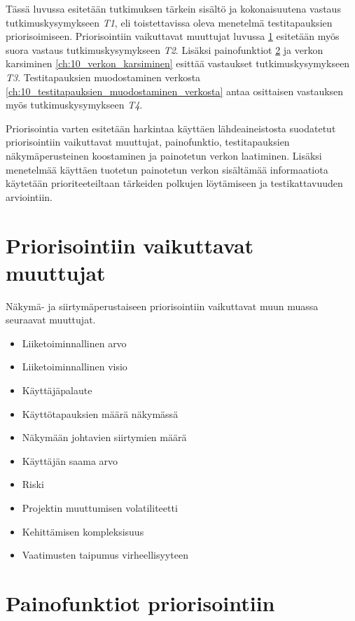 Tässä luvussa esitetään tutkimuksen tärkein sisältö ja kokonaisuutena vastaus tutkimuskysymykseen \emph{T1}, eli toistettavissa oleva menetelmä testitapauksien priorisoimiseen.
Priorisointiin vaikuttavat muuttujat luvussa \ref{ch:10_priorisointiin_vaikuttavat_muuttujat} esitetään myös suora vastaus tutkimuskysymykseen \emph{T2}.
Lisäksi painofunktiot \ref{ch:10_painofunktiot_priorisointiin} ja verkon karsiminen \ref{ch:10_verkon_karsiminen} esittää vastaukset tutkimuskysymykseen \emph{T3}.
Testitapauksien muodostaminen verkosta \ref{ch:10_testitapauksien_muodostaminen_verkosta} antaa osittaisen vastauksen myös tutkimuskysymykseen \emph{T4}.

Priorisointia varten esitetään harkintaa käyttäen lähdeaineistosta suodatetut priorisointiin vaikuttavat muuttujat, painofunktio, testitapauksien näkymäperusteinen koostaminen ja painotetun verkon laatiminen.
Lisäksi menetelmää käyttäen tuotetun painotetun verkon sisältämää informaatiota käytetään prioriteeteiltaan tärkeiden polkujen löytämiseen ja testikattavuuden arviointiin.

\section{Priorisointiin vaikuttavat muuttujat} \label{ch:10_priorisointiin_vaikuttavat_muuttujat}

  Näkymä- ja siirtymäperustaiseen priorisointiin vaikuttavat muun muassa seuraavat muuttujat.

  \begin{itemize}
    \item Liiketoiminnallinen arvo
    \item Liiketoiminnallinen visio
    \item Käyttäjäpalaute
    \item Käyttötapauksien määrä näkymässä
    \item Näkymään johtavien siirtymien määrä
    \item Käyttäjän saama arvo
    \item Riski
    \item Projektin muuttumisen volatiliteetti
    \item Kehittämisen kompleksisuus
    \item Vaatimusten taipumus virheellisyyteen
  \end{itemize}

\section{Painofunktiot priorisointiin} \label{ch:10_painofunktiot_priorisointiin}

